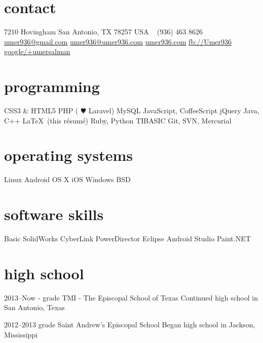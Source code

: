 \documentclass[]{friggeri-cv} %
\begin{document}


\begin{aside} %
\section{contact}
7210 Hovingham 
San Antonio, TX 78257
USA 
~
(936) 463 8626
~
\href{mailto:umer936@gmail.com}{umer936@gmail.com}
\href{mailto:umer936@umer936.com}{umer936@umer936.com}
\href{http://umer936.com}{umer936.com}
\href{http://facebook.com/Umer936}{fb://Umer936}
\href{http://google.com/+umersalman}{google/+umersalman}
~ 
\section{programming}
CSS3 \& HTML5 
PHP ({\color{red} $\varheartsuit$} Laravel) 
MySQL 
JavaScript, CoffeeScript  
jQuery 
Java, C++ 
\LaTeX \ (this r\'esum\'e)
Ruby, Python 
TIBASIC 
Git, SVN, Mercurial 
~
\section{operating systems}
Linux 
Android 
OS X 
iOS 
Windows 
BSD 
~ 
\section{software skills}
Basic SolidWorks 
CyberLink PowerDirector 
Eclipse 
Android Studio 
Paint.NET 
\end{aside}


\section{high school}

\begin{entrylist}


\entry
{2013--Now}
{- {\normalfont grade}}
{TMI - The Episcopal School of Texas}
{Continued high school in San Antonio, Texas}


\entry
{2012--2013}
{ {\normalfont grade}}
{Saint Andrew's Episcopal School}
{Began high school in Jackson, Mississippi}


\end{entrylist}
\end{document}
